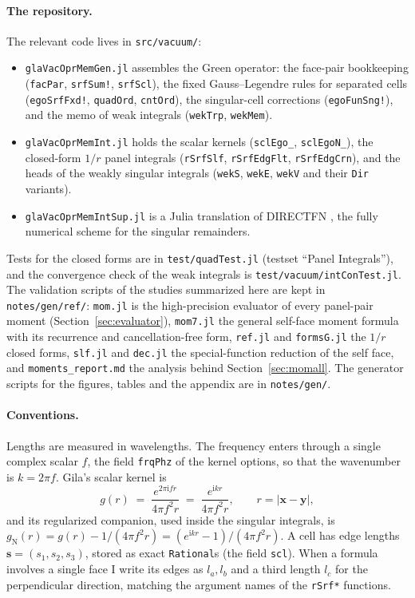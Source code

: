 \documentclass[11pt]{article}
\theoremstyle{remark}
\newcommand{\ii}{\mathrm{i}}
\newcommand{\code}[1]{\texttt{#1}}
\begin{document}
\paragraph{The repository.} The relevant code lives in \code{src/vacuum/}:
\begin{itemize}[nosep]
\item \code{glaVacOprMemGen.jl} assembles the Green operator: the face-pair
bookkeeping (\code{facPar}, \code{srfSum!}, \code{srfScl}), the fixed
Gauss--Legendre rules for separated cells (\code{egoSrfFxd!}, \code{quadOrd},
\code{cntOrd}), the singular-cell corrections (\code{egoFunSng!}), and the memo of
weak integrals (\code{wekTrp}, \code{wekMem}).
\item \code{glaVacOprMemInt.jl} holds the scalar kernels (\code{sclEgo\_},
\code{sclEgoN\_}), the closed-form $1/r$ panel integrals (\code{rSrfSlf},
\code{rSrfEdgFlt}, \code{rSrfEdgCrn}), and the heads of the weakly singular
integrals (\code{wekS}, \code{wekE}, \code{wekV} and their \code{Dir} variants).
\item \code{glaVacOprMemIntSup.jl} is a Julia translation of DIRECTFN
\cite{directfn}, the fully numerical scheme for the singular remainders.
\end{itemize}
Tests for the closed forms are in \code{test/quadTest.jl} (testset ``Panel
Integrals''), and the convergence check of the weak integrals is
\code{test/vacuum/intConTest.jl}. The validation scripts of the studies summarized here are kept in \code{notes/gen/ref/}:
\code{mom.jl} is the high-precision evaluator of every panel-pair moment
(Section~\ref{sec:evaluator}), \code{mom7.jl} the general self-face moment formula with
its recurrence and cancellation-free form, \code{ref.jl} and \code{formsG.jl} the
$1/r$ closed forms, \code{slf.jl} and \code{dec.jl} the special-function reduction of
the self face, and \code{moments\_report.md} the analysis behind
Section~\ref{sec:momall}. The generator scripts for the figures, tables and the
appendix are in \code{notes/gen/}.

\paragraph{Conventions.} Lengths are measured in wavelengths. The frequency enters
through a single complex scalar $f$, the field \code{frqPhz} of the kernel options,
so that the wavenumber is $k = 2\pi f$. Gila's scalar kernel is
\begin{equation}
g(r) \;=\; \frac{e^{2\pi \ii f r}}{4\pi f^{2} r}
\;=\; \frac{e^{\ii k r}}{4\pi f^{2} r},
\qquad r = |\mathbf{x}-\mathbf{y}|,
\label{eq:kernel}
\end{equation}
and its regularized companion, used inside the singular integrals, is
$g_{\mathrm{N}}(r) = g(r) - 1/(4\pi f^2 r) = (e^{\ii k r}-1)/(4\pi f^2 r)$.
A cell has edge lengths $\mathbf{s} = (s_1, s_2, s_3)$, stored as exact
\code{Rational}s (the field \code{scl}). When a formula involves a single face I
write its edges as $l_a, l_b$ and a third length $l_c$ for the perpendicular
direction, matching the argument names of the \code{rSrf*} functions.
\end{document}
